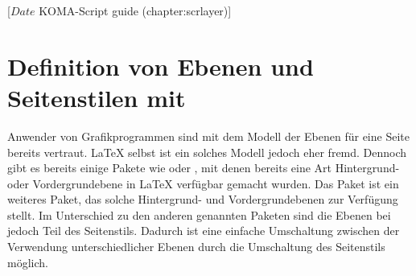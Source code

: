 %
%
%
%
%
%
%
%
% 
%
%
%
%

%
                 [$Date$
                  KOMA-Script guide (chapter:scrlayer)]

\chapter[{Definition von Ebenen und Seitenstilen mit \Package{scrlayer}}]
  {Definition von Ebenen und Seitenstilen
    mit }

\BeginIndexGroup
{}%
%
Anwender von Grafikprogrammen sind mit dem Modell der Ebenen für eine Seite
bereits vertraut. \LaTeX{} selbst ist ein solches Modell jedoch eher
fremd. Dennoch gibt es bereits einige Pakete wie  oder
, mit denen bereits eine Art Hintergrund- oder
Vor\-der\-grund\-ebe\-ne in \LaTeX{} verfügbar gemacht wurden. Das Paket
 ist ein weiteres Paket, das solche Hintergrund- und
Vordergrundebenen zur Verfügung stellt. Im Unterschied zu den anderen
genannten Paketen sind die Ebenen bei  jedoch Teil des
Seitenstils. Dadurch ist eine einfache Umschaltung zwischen der Verwendung
unterschiedlicher Ebenen durch die Umschaltung des Seitenstils möglich.

